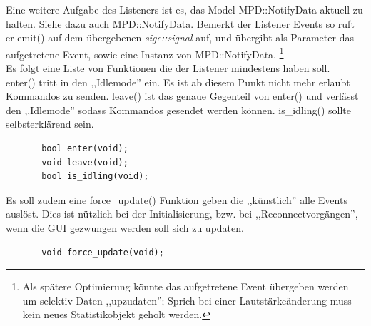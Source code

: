 Eine weitere Aufgabe des Listeners ist es, das Model MPD::NotifyData aktuell zu halten. Siehe dazu auch MPD::NotifyData.
Bemerkt der Listener Events so ruft er emit() auf dem übergebenen \textit{sigc::signal} auf,
und übergibt als Parameter das aufgetretene Event, sowie eine Instanz von MPD::NotifyData.
\footnote{Als spätere Optimierung könnte das aufgetretene Event übergeben werden um selektiv Daten ,,upzudaten''; Sprich bei einer Lautstärkeänderung muss kein neues Statistikobjekt geholt werden.}
\\
Es folgt eine Liste von Funktionen die der Listener mindestens haben soll.
\\
enter() tritt in den ,,Idlemode'' ein. Es ist ab diesem Punkt nicht mehr erlaubt Kommandos zu senden.
leave() ist das genaue Gegenteil von enter() und verlässt den ,,Idlemode'' sodass Kommandos gesendet werden können.  
is\_idling() sollte selbsterklärend sein.
\begin{verbatim}
       bool enter(void);
       void leave(void);
       bool is_idling(void);
\end{verbatim}

Es soll zudem eine force\_update() Funktion geben die ,,künstlich'' alle Events auslöst.
Dies ist nützlich bei der Initialisierung, bzw. bei ,,Reconnectvorgängen'', wenn die GUI gezwungen werden
soll sich zu updaten.
\begin{verbatim}
       void force_update(void);
\end{verbatim}


